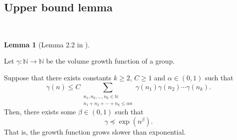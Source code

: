 \documentclass[11pt,a4paper,reqno]{amsart}
\theoremstyle{plain}
\theoremstyle{definition}
\newtheorem{lemma}[theorem]{Lemma}
\theoremstyle{definition}
\renewcommand\leq\leqslant
\renewcommand\geq\geqslant
\begin{document}
\subsection{Upper bound lemma}~

\begin{lemma}[Lemma 2.2 in \cite{GrigorchukPak}]\label{lem:upperbound1}~

\smallskip
Let $\gamma\colon \mathbb N \to \mathbb N$ be the volume growth function of a group.

Suppose that there exists constants $k \geq 2$, $C \geq 1$ and $\alpha \in (0,1)$ such that
\begin{equation}\label{eq:lower_bound}
  \gamma(n)
  \leq
  C\sum_{\substack{n_1,n_2,\ldots,n_k\in \mathbb{N}\\n_1+n_2+\cdots+n_k \leq \alpha n}}
  \gamma(n_1) \gamma(n_2)\cdots \gamma(n_k).
\end{equation}
Then, there exists some $\beta\in (0,1)$ such that
\[
  \gamma \preccurlyeq \exp(n^\beta).
\]
That is, the growth function grows slower than exponential.

\end{lemma}
\end{document}
